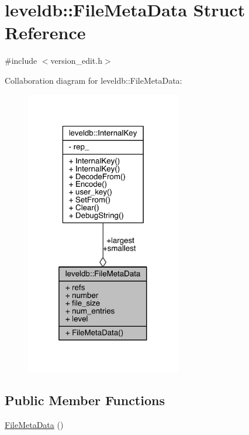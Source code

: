 \hypertarget{structleveldb_1_1_file_meta_data}{}\section{leveldb\+:\+:File\+Meta\+Data Struct Reference}
\label{structleveldb_1_1_file_meta_data}


{\ttfamily \#include $<$version\+\_\+edit.\+h$>$}



Collaboration diagram for leveldb\+:\+:File\+Meta\+Data\+:\nopagebreak
\begin{figure}[H]
\begin{center}
\leavevmode
\includegraphics[width=193pt]{structleveldb_1_1_file_meta_data__coll__graph}
\end{center}
\end{figure}
\subsection*{Public Member Functions}
\begin{DoxyCompactItemize}
\item 
\hyperlink{structleveldb_1_1_file_meta_data_ab809d499cd560df58cc5c529bb69980a}{File\+Meta\+Data} ()
\end{DoxyCompactItemize}
